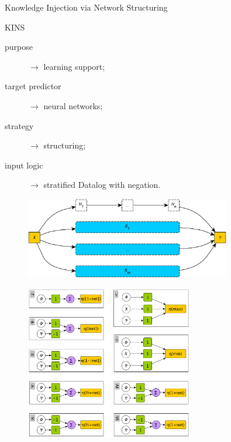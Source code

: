 \documentclass[presentation]{beamer}\mode<presentation>{\usetheme{AMSBolognaFC}}
\begin{document}
\begin{frame}[allowframebreaks]{Knowledge Injection via Network Structuring}
    
    \begin{block}{KINS}
        \begin{description}
            \item[purpose] $\rightarrow$ learning support;
            \item[target predictor] $\rightarrow$ neural networks;
            \item[strategy] $\rightarrow$ structuring;
            \item[input logic] $\rightarrow$ stratified Datalog with negation.
        \end{description}        
    \end{block}

    \framebreak
    
    \begin{figure}
        \centering
        \includegraphics[width=0.8\textwidth]{figures/kins-architecture}
    \end{figure}

    \framebreak
    
    
    
    \framebreak
    
    \begin{figure}
        \centering
        \includegraphics[width=0.65\textwidth]{figures/kins-fuzzifier-modules}
    \end{figure}
    
\end{frame}
\end{document}
